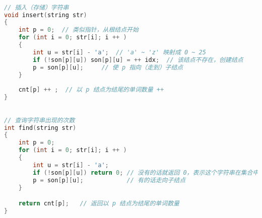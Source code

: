 \begin{lstlisting}[language=cpp]

// 插入（存储）字符串
void insert(string str)
{
    int p = 0;  // 类似指针，从根结点开始
    for (int i = 0; str[i]; i ++ )
    {
        int u = str[i] - 'a';  // 'a' ~ 'z' 映射成 0 ~ 25
        if (!son[p][u]) son[p][u] = ++ idx;  // 该结点不存在，创建结点
        p = son[p][u];     // 使 p 指向（走到）子结点
    }
    
    cnt[p] ++ ;  // 以 p 结点为结尾的单词数量 ++ 
}
\end{lstlisting}

\begin{lstlisting}[language=cpp]

// 查询字符串出现的次数
int find(string str)
{
    int p = 0;
    for (int i = 0; str[i]; i ++ )
    {
        int u = str[i] - 'a';
        if (!son[p][u]) return 0; // 没有的话就返回 0，表示这个字符串在集合中没有出现过
        p = son[p][u];            // 有的话走向子结点
    }

    return cnt[p];   // 返回以 p 结点为结尾的单词数量
}
\end{lstlisting}
